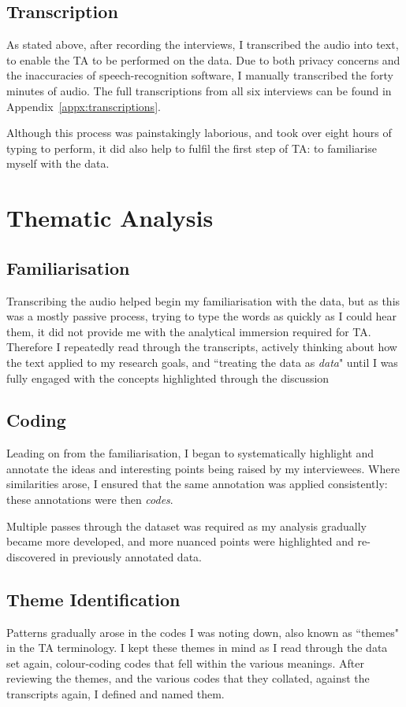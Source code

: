 \subsection{Transcription}
As stated above, after recording the interviews, I transcribed the audio into text, to enable the TA to be performed on the data.
Due to both privacy concerns and the inaccuracies of speech-recognition software, I manually transcribed the forty minutes of audio.
The full transcriptions from all six interviews can be found in Appendix~\ref{appx:transcriptions}.

Although this process was painstakingly laborious, and took over eight hours of typing to perform, it did also help to fulfil the first step of TA: to familiarise myself with the data.


\section{Thematic Analysis}
\subsection{Familiarisation}
Transcribing the audio helped begin my familiarisation with the data, but as this was a mostly passive process, trying to type the words as quickly as I could hear them, it did not provide me with the analytical immersion required for TA.
Therefore I repeatedly read through the transcripts, actively thinking about how the text applied to my research goals, and ``treating the data as \textit{data}"\cite{brauminterviewta} until I was fully engaged with the concepts highlighted through the discussion

\subsection{Coding}
Leading on from the familiarisation, I began to systematically highlight and annotate the ideas and interesting points being raised by my interviewees. 
Where similarities arose, I ensured that the same annotation was applied consistently: these annotations were then \textit{codes}.

Multiple passes through the dataset was required as my analysis gradually became more developed, and more nuanced points were highlighted and re-discovered in previously annotated data.


\subsection{Theme Identification}
Patterns gradually arose in the codes I was noting down, also known as ``themes" in the TA terminology. 
I kept these themes in mind as I read through the data set again, colour-coding codes that fell within the various meanings.
After reviewing the themes, and the various codes that they collated, against the transcripts again, I defined and named them.

